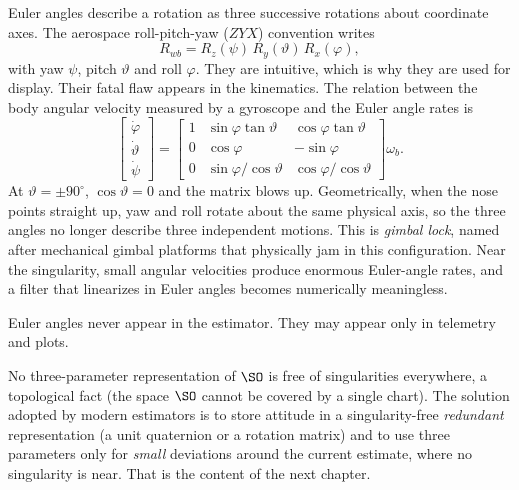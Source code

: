 Euler angles describe a rotation as three successive rotations about coordinate axes. The aerospace
roll-pitch-yaw ($ZYX$) convention writes
\begin{equation}
  R_{wb} = R_z(\psi)\,R_y(\vartheta)\,R_x(\varphi),
\end{equation}
with yaw $\psi$, pitch $\vartheta$ and roll $\varphi$. They are intuitive, which is why they are
used for display. Their fatal flaw appears in the kinematics. The relation between the body angular
velocity measured by a gyroscope and the Euler angle rates is
\begin{equation}
  \begin{bmatrix} \dot\varphi \\ \dot\vartheta \\ \dot\psi \end{bmatrix}
  = \begin{bmatrix}
      1 & \sin\varphi\tan\vartheta & \cos\varphi\tan\vartheta \\
      0 & \cos\varphi & -\sin\varphi \\
      0 & \sin\varphi/\cos\vartheta & \cos\varphi/\cos\vartheta
    \end{bmatrix} \omega_b .
  \label{eq:euler-rates}
\end{equation}
At $\vartheta = \pm90^\circ$, $\cos\vartheta = 0$ and the matrix blows up. Geometrically, when the
nose points straight up, yaw and roll rotate about the same physical axis, so the three angles no
longer describe three independent motions. This is \emph{gimbal lock}, named after mechanical
gimbal platforms that physically jam in this configuration. Near the singularity, small angular
velocities produce enormous Euler-angle rates, and a filter that linearizes in Euler angles becomes
numerically meaningless.

\begin{convention}[AGENTS.md C2]
Euler angles never appear in the estimator. They may appear only in telemetry and plots.
\end{convention}

No three-parameter representation of $\SO$ is free of singularities everywhere, a topological fact
(the space $\SO$ cannot be covered by a single chart). The solution adopted by modern estimators is to
store attitude in a singularity-free \emph{redundant} representation (a unit quaternion or a rotation
matrix) and to use three parameters only for \emph{small} deviations around the current estimate, where
no singularity is near. That is the content of the next chapter.


